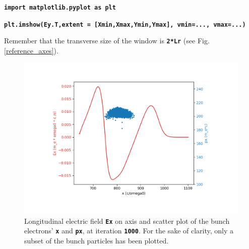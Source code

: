 \documentclass[a4paper,12pt]{extarticle}
\newcommand{\commandline}[1]{\texttt{\textbf{#1}}}
\begin{document}
\commandline{import matplotlib.pyplot as plt}

\commandline{plt.imshow(Ey.T,extent = [Xmin,Xmax,Ymin,Ymax], vmin=..., vmax=...)}

Remember that the transverse size of the window is \commandline{2*Lr} (see Fig.\ref{reference_axes}).

\begin{figure}[!htb]
   \begin{minipage}{0.48\textwidth}
     \centering
     \includegraphics[width=1\linewidth]{ExScatterXPx.pdf}
     \caption{Longitudinal electric field \commandline{Ex} on axis and scatter plot of the bunch electrons' \commandline{x} and \commandline{px}, at iteration \commandline{1000}.  For the sake of clarity, only a subset of the bunch particles has been plotted.}\label{ExScatterXPx}
   \end{minipage}\hfill
   \begin{minipage}{0.48\textwidth}
     \centering

\end{minipage}
\end{figure}
\end{document}
